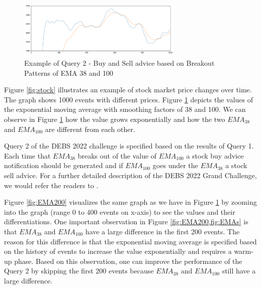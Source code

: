 \begin{figure}[!ht]
    \begin{center}
        \includegraphics[width=0.70\textwidth]{./images/query2_example.png}
        \caption{Example of Query 2 - Buy and Sell advice based on Breakout Patterns of EMA 38 and 100 }
        \label{fig:EMAs}
    \end{center}
\end{figure}


Figure \ref{fig:stock} illustrates an example of stock market price changes over time. The graph shows 1000 events with
different prices. Figure \ref{fig:EMAs} depicts the values of the exponential moving average with
smoothing factors of 38 and 100. We can observe in Figure \ref{fig:EMAs} how the value grows exponentially
and how the two $EMA_{38}$ and $EMA_{100}$ are different from each other.

Query 2 of the DEBS 2022 challenge \cite{debs2022challenge} is specified based on the results of Query 1. Each time
that $EMA_{38}$ breaks out of the value of $EMA_{100}$ a stock buy advice notification should be generated and if
$EMA_{100}$ goes under the $EMA_{38}$ a stock sell advice. For a further detailed description of the DEBS 2022
Grand Challenge, we would refer the readers to \cite{debs2022challenge}.

Figure \ref{fig:EMA200} visualizes the same graph as we have in Figure \ref{fig:EMAs} by
zooming into the graph (range 0 to 400 events on x-axis) to see the values and their differentiations. One important observation in
Figure \ref{fig:EMA200,fig:EMAs} is that $EMA_{38}$ and $EMA_{100}$ have a large difference in the first
200 events.  The reason for this difference is that the exponential moving average is specified based
on the history of events to increase the value exponentially and requires a warm-up phase. Based on this observation,
one can improve the performance of the Query 2 by skipping the first 200 events because
$EMA_{38}$ and $EMA_{100}$ still have a large difference.

